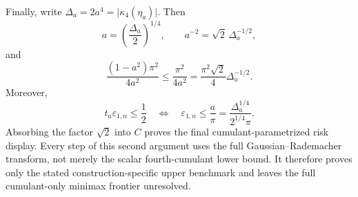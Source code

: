 Finally, write \(\Delta_a=2a^4=\lvert\kappa_4(\eta_a)\rvert\).  Then
\[
 a=\left(\frac{\Delta_a}{2}\right)^{1/4},
 \qquad
 a^{-2}=\sqrt2\,\Delta_a^{-1/2},
\]
and
\[
 \frac{(1-a^2)\pi^2}{4a^2}
 \leq\frac{\pi^2}{4a^2}
 =\frac{\pi^2\sqrt2}{4}\Delta_a^{-1/2}.
\]
Moreover,
\[
 t_a\varepsilon_{1,n}\leq\frac12
 \quad\Longleftrightarrow\quad
 \varepsilon_{1,n}\leq\frac{a}{\pi}
 =\frac{\Delta_a^{1/4}}{2^{1/4}\pi}.
\]
Absorbing the factor \(\sqrt2\) into \(C\) proves the final cumulant-parametrized risk display.  Every step of this second argument uses the full Gaussian--Rademacher transform, not merely the scalar fourth-cumulant lower bound.  It therefore proves only the stated construction-specific upper benchmark and leaves the full cumulant-only minimax frontier unresolved.
